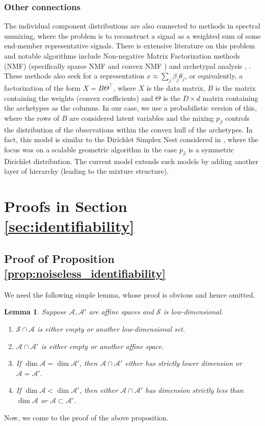 \documentclass[bj,authoryear]{imsart}
\theoremstyle{plain}
\newtheorem{lemma}{Lemma}[section]
\theoremstyle{remark}
\def\cA{\mathcal{A}}
\def\cS{\mathcal{S}}
\begin{document}
\begin{appendix}
\subsubsection*{Other connections}
The individual component distributions are also connected to methods in spectral unmixing, where the problem is to reconstruct a signal as a weighted sum of some end-member representative signals. There is extensive literature on this problem and notable algorithms include Non-negative Matrix Factorization methods (NMF) (specifically sparse NMF and convex NMF \cite{ding2008convex}) and archetypal analysis \cite{cutler1994archetypal}, \cite{javadi2020nonnegative}. These methods also seek for a representation $x\approx \sum_j \beta_j \theta_j$, or equivalently, a factorization of the form $X=B\Theta^\top$, where $X$ is the data matrix, $B$ is the matrix containing the weights (convex coefficients) and $\Theta$ is the $D\times d$ matrix containing the archetypes as the columns. In our case, we use a probabilistic version of this, where the rows of $B$ are considered latent variables and the mixing $p_{\beta}$ controls the distribution of the observations within the convex hull of the archetypes. In fact, this model is similar to the Dirichlet Simplex Nest considered in \cite{yurochkin2019dirichlet}, where the focus was on a scalable geometric algorithm in the case $p_{\beta}$ is a symmetric Dirichlet distribution. The current model extends such models by adding another layer of hierarchy (leading to the mixture structure).

\section{Proofs in Section \ref{sec:identifiability}}

\subsection{Proof of Proposition \ref{prop:noiseless_identifiability}}
\label{app:proof_prop:noiseless_identifiability}

We need the following simple lemma, whose proof is obvious and hence omitted.
\begin{lemma}
Suppose $\cA,\cA'$ are affine spaces and $\cS$ is low-dimensional.
\begin{enumerate}
    \item $\cS\cap\cA$ is either empty or another low-dimensional set.
    \item $\cA\cap\cA'$ is either empty or another affine space.
    \item If $\dim \cA=\dim\cA'$, then $\cA\cap\cA'$ either has strictly lower dimension or $\cA=\cA'$.
    \item If $\dim\cA<\dim\cA'$, then either $\cA\cap\cA'$ has dimension strictly less than $\dim\cA$ or $\cA\subset \cA'$.
\end{enumerate}
\end{lemma}
Now, we come to the proof of the above proposition.


\end{appendix}
\end{document}
